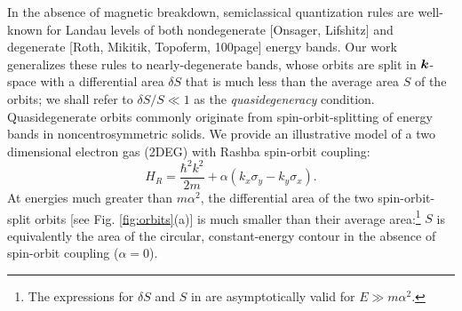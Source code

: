 \documentclass[aps, prb, showpacs, twocolumn, notitlepage, superscriptaddress]{revtex4-1}
\begin{document}


In the absence of magnetic breakdown, semiclassical quantization rules are well-known for Landau levels of  both nondegenerate [Onsager, Lifshitz] and degenerate [Roth, Mikitik, Topoferm, 100page] energy bands. Our work generalizes these rules to nearly-degenerate bands, whose orbits are split in $\boldsymbol{k}$-space with a differential area  $\delta S$ that is much less than the average area $S$ of the orbits; we shall refer to $\delta S/S{\ll}1$ as the \textit{quasidegeneracy} condition. Quasidegenerate orbits commonly originate from spin-orbit-splitting of energy bands in noncentrosymmetric solids. We provide an illustrative model of a two dimensional electron gas (2DEG) with Rashba spin-orbit coupling:
\begin{equation}
H_R=\frac{{\hbar^2} k^2}{2m}+\alpha  (k_{x}\sigma_{y}-k_{y}\sigma_{x}).\label{eq:Rashba-Hamiltonian}
\end{equation}
At energies much greater than $m\alpha^2$, the differential area of the two spin-orbit-split orbits [see Fig. \ref{fig:orbits}(a)] is much smaller than their average area:\footnote{The expressions for $\delta S$ and $S$ in  are asymptotically valid for $E{\gg}m\alpha^2$.}
$S$ is equivalently the area of the circular, constant-energy contour in the absence of spin-orbit coupling ($\alpha{=}0$).
\end{document}
